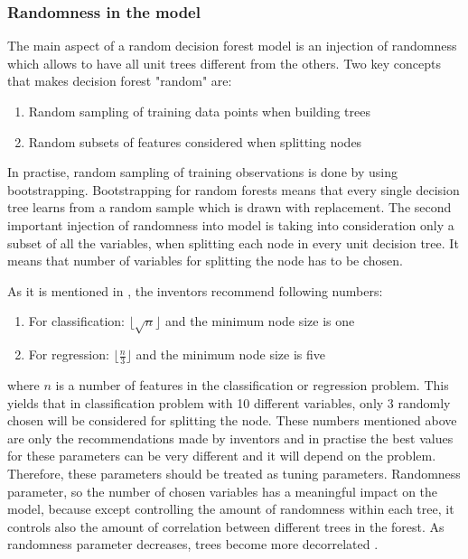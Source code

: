 \subsubsection{Randomness in the model}
The main aspect of a random decision forest model is an injection of randomness which allows to have all unit trees different from the others. Two key concepts that makes decision forest "random" are:
\begin{enumerate}
	\item Random sampling of training data points when building trees
	\item Random subsets of features considered when splitting nodes
\end{enumerate}

In practise, random sampling of training observations is done by using bootstrapping. 
Bootstrapping for random forests means that every single decision tree learns from a random sample which is drawn with replacement. 
The second important injection of randomness into model is taking into consideration only a subset of all the variables, 
when splitting each node in every unit decision tree. It means that number of variables for splitting the node has to be chosen.
 
As it is mentioned in \cite{friedman2001elements}, the inventors recommend following numbers:
\begin{enumerate}
	\item For classification:  $\lfloor{\sqrt{n}} \rfloor$ and the minimum node size is one
	\item For regression: $\lfloor \frac{n}{3} \rfloor$ and the minimum node size is five
\end{enumerate}

where $n$ is a number of features in the classification or regression problem. 
\newline
\newline 
This yields that in classification problem with 10 different variables, 
only 3 randomly chosen will be considered for splitting the node.
These numbers mentioned above are only the recommendations made by inventors and in practise the best values for these
parameters can be very different and it will depend on the problem. Therefore, these parameters
should be treated as tuning parameters. Randomness parameter, 
so the number of chosen variables has a meaningful impact on the model, 
because except controlling the amount of randomness within each tree, 
it controls also the amount of correlation between different trees in the forest. 
As randomness parameter decreases, trees become more decorrelated \cite{criminisi2012decision}.

